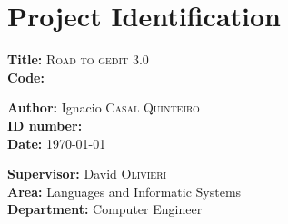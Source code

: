 
\chapter{Project Identification}

\textbf{Title:} \textsc{Road to gedit 3.0}\\
\textbf{Code:} %

\noindent\textbf{Author:} Ignacio \textsc{Casal Quinteiro}\\
\textbf{ID number:} \\ %
\textbf{Date:} \today

\noindent\textbf{Supervisor:} David \textsc{Olivieri}\\
\textbf{Area:} Languages and Informatic Systems\\
\textbf{Department:} Computer Engineer
